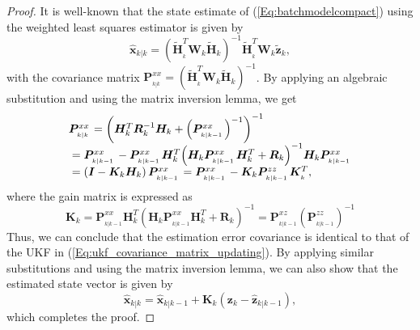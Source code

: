 \documentclass[10pt]{IEEEtran}
\begin{document}
\begin{proof}
It is well-known that the state estimate of (\ref{Eq:batchmodelcompact}) using the weighted least squares estimator is given by
\begin{equation}
{\bm{\widehat x}_{k\left| k \right.}} = {\left( {\bm{\widetilde H}_{_k}^T{\bm{W}_k}{\bm{\widetilde H}_k}} \right)^{ - 1}}\bm{\widetilde H}_{_k}^T{\bm{W}_k}{\bm{\widetilde z}_k},
\label{Eq:LSE_estimate}
\end{equation}
with the covariance matrix $\bm{P}_{_{k\left| {k} \right.}}^{xx}={\left( {\bm{\widetilde H}_{_k}^T{\bm{W}_k}{\bm{\widetilde H}_k}} \right)^{ - 1}}$. By applying an algebraic substitution and using the matrix inversion lemma, we get
\begin{equation}
\begin{array}{l}
\bm{P}_{_{k\left| k \right.}}^{xx} = {\left( {\bm{H}_k^T\bm{R}_k^{ - 1}{\bm{H}_k} + {{\left( {\bm{P}_{_{k\left| {k - 1} \right.}}^{xx}} \right)}^{ - 1}}} \right)^{ - 1}}\\
{\rm{}} = \bm{P}_{_{k\left| {k - 1} \right.}}^{xx} - \bm{P}_{_{k\left| {k - 1} \right.}}^{xx}\bm{H}_k^T{\left( {{\bm{H}_k}\bm{P}_{_{k\left| {k - 1} \right.}}^{xx}\bm{H}_k^T + {\bm{R}_k}} \right)^{ - 1}}{\bm{H}_k}\bm{P}_{_{k\left| {k - 1} \right.}}^{xx}\\
{\rm{}} = \left( {\bm{I} - {\bm{K}_k}{\bm{H}_k}} \right)\bm{P}_{_{k\left| {k - 1} \right.}}^{xx} = \bm{P}_{_{k\left| {k - 1} \right.}}^{xx} - {\bm{K}_k}\bm{P}_{_{k\left| {k - 1} \right.}}^{zz}\bm{K}_{_k}^T,
\end{array}
\label{Eq:LSE_estimate_covariance}
\end{equation}
where the gain matrix is expressed as
\begin{equation}
{\bm{K}_k}=\bm{P}_{_{k| {k - 1}}}^{xx}\bm{H}_k^T{( {{\bm{H}_k}\bm{P}_{_{k| {k - 1}}}^{xx}\bm{H}_k^T + {\bm{R}_k}})^{ - 1}}=\bm{P}_{_{k| {k - 1}}}^{xz}{( {\bm{P}_{_{k| {k - 1}}}^{zz}})^{ - 1}}
\label{Eq:LSE_estimate_gain_matrix}
\end{equation}
Thus, we can conclude that the estimation error covariance is identical to that of the UKF in (\ref{Eq:ukf_covariance_matrix_updating}). By applying similar substitutions and using the matrix inversion lemma, we can also show that the estimated state vector is given by
\begin{equation}
{\bm{\widehat x}_{k\left| k \right.}} = {\bm{\widehat x}_{k\left| {k - 1} \right.}} + {\bm{K}_k}\left( {{\bm{z}_{k}} - {{\bm{\widehat z}}_{k\left| {k - 1} \right.}}} \right),
\label{Eq:LSE_filtering}
\end{equation}
which completes the proof.
\end{proof}
\end{document}
